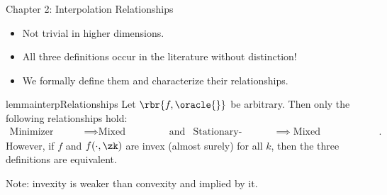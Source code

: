 \documentclass[mathserif,notheorems, hyperref={colorlinks, citecolor=blue, urlcolor=blue, linkcolor=blue}]{beamer}
\def\\{}%
\begin{document}
    \begin{frame}{Chapter 2: Interpolation Relationships}

        \begin{itemize}
            \item Not trivial in higher dimensions. 
            \item All three definitions occur in the literature without distinction!
            \item We formally define them and characterize their relationships. 
        \end{itemize}

        \pause

        \begin{restatable}{lemma}{interpRelationships}
            Let \( \rbr{f, \oracle{}} \) be arbitrary. 
            Then only the following relationships hold: 
            \begin{align*}
                \text{Minimizer Interpolation} &\implies \text{Mixed Interpolation} \\
                                                                                       & \text{and} &\\
                \text{Stationary-Point Interpolation} &\implies \text{Mixed Interpolation}.
            \end{align*}
            However, if \( f \) and \( f(\cdot, \zk) \) are invex (almost surely) for all \( k \), then the three definitions are equivalent. 
        \end{restatable}

        Note: invexity is weaker than convexity and implied by it. 
        
    \end{frame}
   
\end{document}
